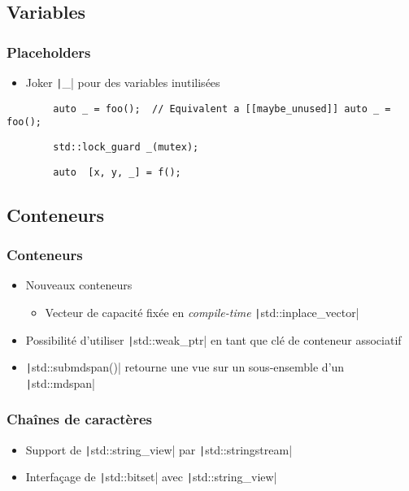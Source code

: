\documentclass[C++.tex]{subfiles}
\begin{document}
\subsection*{Variables}
\begin{frame}[fragile]
	\frametitle{Placeholders}
	\begin{itemize}
		\item Joker \texttt|_| pour des variables inutilisées
	\end{itemize}
	
	\begin{verbatim}
		auto _ = foo();  // Equivalent a [[maybe_unused]] auto _ = foo();
	\end{verbatim}

	\begin{verbatim}
		std::lock_guard _(mutex);
	\end{verbatim}

	\begin{verbatim}
		auto  [x, y, _] = f();
	\end{verbatim}
\end{frame}

\subsection*{Conteneurs}
\begin{frame}[fragile]
	\frametitle{Conteneurs}
	\begin{itemize}
		\item Nouveaux conteneurs
		\begin{itemize}
			\item Vecteur de capacité fixée en \textit{compile-time} \texttt|std::inplace_vector|

		\end{itemize}
		\item Possibilité d'utiliser \texttt|std::weak_ptr| en tant que clé de conteneur associatif
		\item \texttt|std::submdspan()| retourne une vue sur un sous-ensemble d'un \texttt|std::mdspan|
	\end{itemize}
\end{frame}

\begin{frame}[fragile]
	\frametitle{Chaînes de caractères}
	\begin{itemize}
		\item Support de \texttt|std::string_view| par \texttt|std::stringstream|
		\item Interfaçage de \texttt|std::bitset| avec \texttt|std::string_view|
	\end{itemize}
\end{frame}
\end{document}
